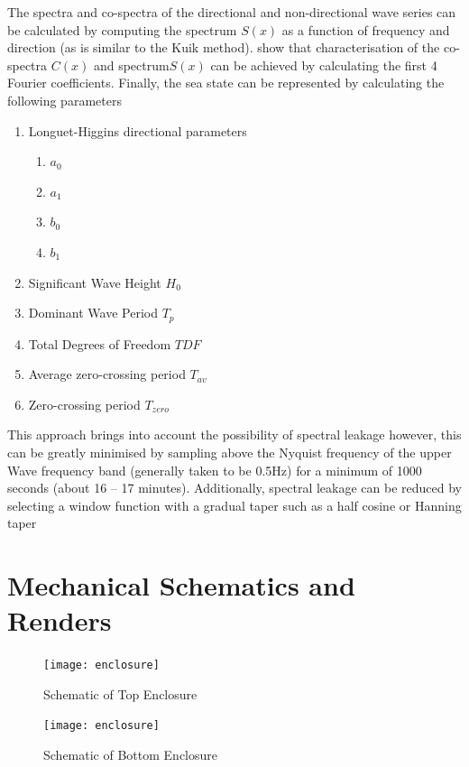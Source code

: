 The spectra and co-spectra of the directional and non-directional wave series can be calculated by computing the spectrum $S(x)$ as a function of frequency and direction (as is similar to the Kuik method). \textcite{earle1996nondirectional} show that characterisation of the co-spectra $C(x)$ and spectrum$S(x)$ can be achieved by calculating the first 4 Fourier coefficients. Finally, the sea state can be represented by calculating the following parameters

\begin{enumerate}
	\item Longuet-Higgins directional parameters
	\begin{enumerate}
		\item $a_0$
		\item $a_1$
		\item $b_0$
		\item $b_1$
	\end{enumerate}
	\item Significant Wave Height $H_0$
	\item Dominant Wave Period $T_p$
	\item Total Degrees of Freedom $TDF$
	\item Average zero-crossing period $T_{av}$
	\item Zero-crossing period $T_{zero}$
\end{enumerate}

This approach brings into account the possibility of spectral leakage however, this can be greatly minimised by sampling above the Nyquist frequency of the upper Wave frequency band (generally taken to be 0.5Hz) for a minimum of 1000 seconds (about 16 – 17 minutes). Additionally, spectral leakage can be reduced by selecting a window function with a gradual taper such as a half cosine or Hanning taper \cite{welch1967use}\par


\chapter{Mechanical Schematics and Renders}
\label{ch:appendix.schem}

\begin{figure}[H]
    \centering
\texttt{[image: enclosure]}
    \caption{Schematic of Top Enclosure}
    \label{fig:top_schem}
\end{figure}

\begin{figure}[H]
    \centering
\texttt{[image: enclosure]}
    \caption{Schematic of Bottom Enclosure}
    \label{fig:bot_schem}
\end{figure}

